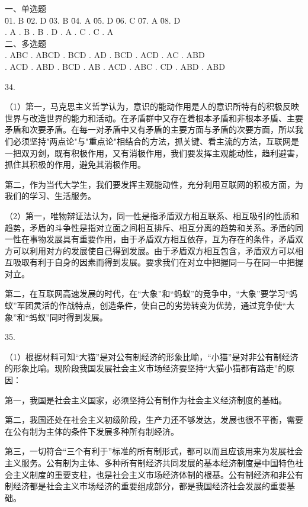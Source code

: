 \documentclass[a4paper]{article}
\begin{document}
\begin{tabbing}
一、单选题\\
\= 01. B \qquad \= 02. D \qquad \= 03. B \qquad \= 04. A \qquad \= 05. D \qquad \= 06. C \qquad \= 07. A \qquad \= 08. D \qquad \= \\
. A . B . B . D . A . C . C . A \\
二、多选题\\
. ABC . ABCD . BCD . AD . BCD . ACD . AC . ABD\\
. ACD . ABD . BCD . AB . ACD . ABC . CD . ABD . ABD\\
\end{tabbing}

34.

（1）第一，马克思主义哲学认为，意识的能动作用是人的意识所特有的积极反映世界与改造世界的能力和活动。在矛盾群中又存在着根本矛盾和非根本矛盾、主要矛盾和次要矛盾。在每一对矛盾中又有矛盾的主要方面与矛盾的次要方面，所以我们必须坚持"两点论"与"重点论"相结合的方法，抓关键、看主流的方法，互联网是一把双刃剑，既有积极作用，又有消极作用，我们要发挥主观能动性，趋利避害，抓住其积极的作用，避免其消极作用。

第二，作为当代大学生，我们要发挥主观能动性，充分利用互联网的积极方面，为我们的学习、生活服务。

（2）第一，唯物辩证法认为，同一性是指矛盾双方相互联系、相互吸引的性质和趋势，矛盾的斗争性是指对立面之间相互排斥、相互分离的趋势和关系。矛盾的同一性在事物发展具有重要作用，由于矛盾双方相互依存，互为存在的条件，矛盾双方可以利用对方的发展使自己得到发展。由于矛盾双方相互包含，矛盾双方可以相互吸取有利于自身的因素而得到发展。要求我们在对立中把握同一与在同一中把握对立。

第二，在互联网高速发展的时代，在“大象”和“蚂蚁”的竞争中，“大象”要学习“蚂蚁”军团灵活的作战特点，创造条件，使自己的劣势转变为优势，通过竞争使“大象”和“蚂蚁”同时得到发展。

35.

（1）根据材料可知“大猫”是对公有制经济的形象比喻，“小猫”是对非公有制经济的形象比喻。现阶段我国发展社会主义市场经济要坚持“大猫小猫都有路走”的原因：

第一，我国是社会主义国家，必须坚持公有制作为社会主义经济制度的基础。

第二，我国还处在社会主义初级阶段，生产力还不够发达，发展也很不平衡，需要在公有制为主体的条件下发展多种所有制经济。

第三，一切符合“三个有利于”标准的所有制形式，都可以而且应该用来为发展社会主义服务。公有制为主体、多种所有制经济共同发展的基本经济制度是中国特色社会主义制度的重要支柱，也是社会主义市场经济体制的根基。公有制经济和非公有制经济都是社会主义市场经济的重要组成部分，都是我国经济社会发展的重要基础。
\end{document}
